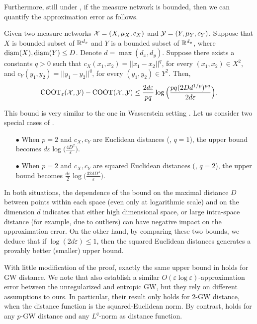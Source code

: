 Furthermore, still under , if the measure network is bounded,
then we can quantify the approximation error as follows.
\begin{proposition} \label{prop:quant_bound_ent}
  Given two measure networks $\mathcal X = (X, \mu_X, c_X)$ and $\mathcal Y = (Y, \mu_Y, c_Y)$.
  Suppose that $X$ is bounded subset of $\mathbb R^{d_x}$ and $Y$ is a bounded subset
  of $\mathbb R^{d_y}$, where $\text{diam}(X), \text{diam}(Y) \leq D$.
  Denote $d = \max(d_x, d_y)$. Suppose there exists a constants $q > 0$ such that
  $c_X(x_1, x_2) = \vert\vert x_1 - x_2 \vert\vert^q$, for every $(x_1,x_2) \in X^2$, and
  $c_Y(y_1, y_2) = \vert\vert y_1 - y_2 \vert\vert^q$, for every $(y_1,y_2) \in Y^2$. Then,
  \begin{equation}
    \text{COOT}_{\varepsilon}(\mathcal X, \mathcal Y) - \text{COOT}(\mathcal X, \mathcal Y) \leq
    \frac{2d \varepsilon}{pq} \log\Big( \frac{pq (2D d^{1/p})^{pq}}{2d \varepsilon} \Big).
  \end{equation}
\end{proposition}
This bound is very similar to the one in Wasserstein setting \citep{Genevay19}.
Let us consider two special cases of .
\begin{itemize}
  \item[$\bullet$] When $p=2$ and $c_X, c_Y$ are Euclidean distances (\ie, $q=1$),
  the upper bound becomes $d\varepsilon \log\Big( \frac{4D^2}{\varepsilon} \Big)$.

  \item[$\bullet$] When $p=2$ and $c_X, c_Y$ are squared Euclidean distances
  (\ie, $q=2$), the upper bound becomes
  $\frac{d\varepsilon}{2} \log\Big( \frac{32dD^4}{\varepsilon} \Big)$.
\end{itemize}
In both situations, the dependence of the bound on the maximal distance $D$ between points
within each space (even only at logarithmic scale) and on the dimension $d$ indicates
that either high dimensional space, or large intra-space distance (for example, due to outliers)
can have negative impact on the approximation error. On the other hand,
by comparing these two bounds, we deduce that if $\log(2d \varepsilon) \leq 1$,
then the squared Euclidean distances generates a provably better (smaller) upper bound.

With little modification of the proof, exactly the same upper bound in 
holds for GW distance. We note that \citet{Zhang23} also establish a similar
$O(\varepsilon \log \varepsilon)$-approximation error between the unregularized and entropic GW,
but they rely on different assumptions to ours. In particular, their result only holds
for $2$-GW distance, when the distance function is the squared-Euclidean norm. By contrast,
 holds for any $p$-GW distance and any $L^q$-norm as distance function.


